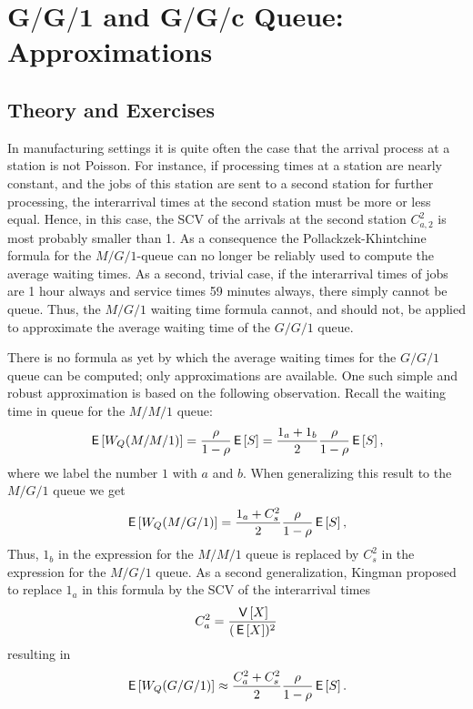 \section
[$G/G/1$  and $G/G/c$ Queue: Approximations]
{$\mathbf{G/G/1}$  and $\mathbf{G/G/c}$ Queue: Approximations}
\label{sec:gg1}


\subsection*{Theory and Exercises}






In manufacturing settings it is quite often the case that the arrival
process at a station is not Poisson. For instance, if processing times
at a station are nearly constant, and the jobs of this station are
sent to a second station for further processing, the interarrival
times at the second station must be more or less equal. Hence, in this
case, the SCV of the arrivals at the second station $C_{a,2}^2$ is
most probably smaller than 1. As a consequence the
Pollackzek-Khintchine formula for the $M/G/1$-queue can no longer be
reliably used to compute the average waiting times.  As a second,
trivial case, if the interarrival times of jobs are 1 hour always and
service times 59 minutes always, there simply cannot be queue. Thus,
the $M/G/1$ waiting time formula cannot, and should not, be applied to
approximate the average waiting time of the $G/G/1$ queue. 

There is no formula as yet by which the average waiting times for the
$G/G/1$ queue can be computed; only approximations are available. One
such simple and robust approximation is based on the following
observation. Recall  the waiting time in queue for the $M/M/1$ queue:
\begin{equation*}
  \,\mathsf{E}\left[W_Q(M/M/1)\right] = \frac{\rho}{1-\rho} \,\mathsf{E}\left[S\right] = 
\frac{1_a + 1_b}2 \frac{\rho}{1-\rho} \,\mathsf{E}\left[S\right],
\end{equation*}
where we label the number $1$ with $a$ and $b$. When generalizing this
result to the $M/G/1$ queue we get
\begin{equation*}
  \,\mathsf{E}\left[W_Q(M/G/1)\right] = \frac{1_a + C_s^2}2 \frac{\rho}{1-\rho} \,\mathsf{E}\left[S\right],
\end{equation*}
Thus, $1_b$ in the expression for the $M/M/1$ queue is replaced by
$C_s^2$ in the expression for the $M/G/1$ queue. As a second
generalization, Kingman proposed to replace $1_a$ in this formula by
the SCV of the interarrival times
\begin{equation*}
C_a^2 = \frac{\,\mathsf{V}\left[X\right]}{(\,\mathsf{E}\left[X\right])^2}
\end{equation*}
resulting in
\begin{equation*}
  \,\mathsf{E}\left[W_Q(G/G/1)\right] \approx \frac{C_a^2 + C_s^2}2 \frac{\rho}{1-\rho} \,\mathsf{E}\left[S\right].
\end{equation*}

